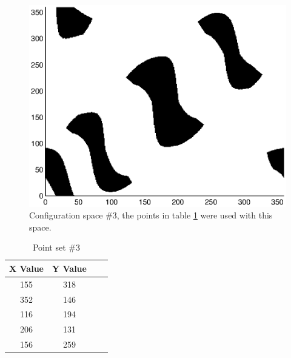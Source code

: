 \begin{figure}[h]
	\centering
	\includegraphics[width=\figWidth]{./figures/cspace4.eps}
	\caption{Configuration space \#3, the points in table \ref{tbl:pts3} were used with this space.}
	\label{fig:space3}
\end{figure}

\begin{table} [h]
\renewcommand{\arraystretch}{1.4}
	\caption{Point set \#3}
\label{tbl:pts3}
\begin{center}
		\begin{tabular}{ c | c  c  p{1.8cm} }
				X Value & Y Value \\ \hline
 155 &  318\\
   352&   146\\
   116 &  194\\
   206  & 131\\
   156   &259 \\
\end{tabular}
\end{center}
\end{table}
